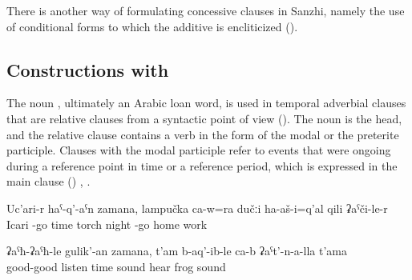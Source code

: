 There is another way of formulating concessive clauses in Sanzhi, namely the use of conditional forms to which the additive is encliticized ().



\subsection{Constructions with  }
\label{sec:constructions with zamana}

The noun  , ultimately an Arabic loan word, is used in temporal adverbial clauses that are relative clauses from a syntactic point of view (). The noun  is the head, and the relative clause contains a verb in the form of the modal or the preterite participle. Clauses with the modal participle refer to events that were ongoing during a reference point in time or a reference period, which is expressed in the main clause () , .
%
\begin{exe}
	\ex	\label{ex:‎While he came from Icari, he went with a torch at night home from work}
	\gll	Uc'ari-r	haˁ-q'-aˁn	zamana,	lampučka	ca-w=ra	dučːi	ha-aš-i=q'al	qili	ʡaˁči-le-r\\
		Icari	-go	time	torch		night	-go	home	work\\
	\glt	{}

	\ex	\label{ex:‎‎‎When he was attentively listening he heard the sound of frogs}
	\gll	ʡaˁħ-ʡaˁħ-le	gulik'-an	zamana,	t'am	b-aq'-ib-le	ca-b	ʡaˁt'-n-a-lla	t'ama\\
		good-good	listen	time	sound	hear		frog	sound\\
	\glt	{}
\end{exe}

